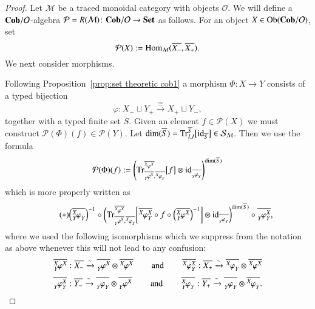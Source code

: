 \documentclass{amsart}
\def\tn{\textnormal}
\def\mc{\mathcal}
\def\Hom{\tn{Hom}}
\def\Ob{\tn{Ob}}
\def\dim{\tn{dim}}
\def\Trace{\tn{Tr}}
\def\hsp{\hspace{.3in}}
\def\to{\rightarrow}
\def\taking{\colon}
\def\too{\longrightarrow}
\def\iso{\cong}
\def\ol{\overline}
\newcommand{\To}[1]{\xrightarrow{#1}}
\def\id{\tn{id}}
\def\Cob{{\bf Cob}}
\def\Set{{\bf Set}}
\def\mcM{\mc{M}}
\def\mcO{\mc{O}}
\def\mcP{\mc{P}}
\def\mcS{\mc{S}}
\newcommand{\inp}[1]{{#1_-}}
\newcommand{\outp}[1]{{#1_+}}
\newcommand{\feeddd}[3]{{\tensor*[^{#2}_{\color{white}{!}}]{{#1}}{^{#3}}}}%
\newcommand{\feeddc}[3]{{\tensor*[^{#2}]{{#1}}{_{#3}}}}
\newcommand{\feedcd}[3]{{\tensor*[_{#2}]{{#1}}{^{#3}}}}
\newcommand{\feedcc}[3]{{\tensor*[^{\color{white}{!}}_{#2}]{{#1}}{_{#3}}}}
\newcommand{\feedda}[3]{{\tensor*[^{#2}_{\color{white}{!}}]{{#1}}{^{#2}_{#3}}}}
\newcommand{\feedca}[3]{{\tensor*[_{#2}]{{#1}}{_{#2}^{#3}}}}
\newcommand{\feedad}[3]{{\tensor*[^{#2}_{#3}]{{#1}}{^{#2}}}}
\newcommand{\feedac}[3]{{\tensor*[_{#2}^{#3}]{{#1}}{_{#2}}}}
\newcommand{\vLst}[1]{\ol{#1}}
\newcommand{\vinp}[1]{\vLst{\inp{#1}}}
\newcommand{\voutp}[1]{\vLst{\outp{#1}}}
\theoremstyle{remark}
\theoremstyle{definition}
\begin{document}
\begin{proof}

Let $\mcM$ be a traced monoidal category with objects $\mcO$. We will define a $\Cob/\mcO$-algebra $\mcP=R(\mcM)\taking\Cob/\mcO\to\Set$ as follows. For an object $X\in\Ob(\Cob/\mcO)$, set 
$$\mcP(X):=\Hom_{\mcM}(\vinp{X},\voutp{X}).$$
We next consider morphisms.


Following Proposition~\ref{prop:set theoretic cob1} a morphism $\Phi\taking X\too Y$ consists of a typed bijection 
$$\varphi\taking\inp{X}\sqcup \outp{Y}\To{\iso}\outp{X}\sqcup \inp{Y},$$ 
together with a typed finite set $S$. Given an element $f\in\mcP(X)$ we must construct $\mcP(\Phi)(f)\in\mcP(Y)$. Let $\dim(\ol{S})=\Trace^{\ol{S}}_{I,I}\big[\id_{\ol{S}}\big]\in\mcS_\mcM$. Then we use the formula
$$\mcP(\Phi)(f):=
\left(\Trace^{\ol{\feeddd{\varphi}{X}{X}}}_{\ol{\feedcd{\varphi}{Y}{X}},\ol{\feeddc{\varphi}{X}{Y}}}\big[f\big]
\otimes\id_{\ol{\feedcc{\varphi}{Y}{Y}}}\right)^{\dim(\ol{S})}
$$
which is more properly written as
\[\tag{$*$}\Big(\ol{\feedac{\varphi}{Y}{X}}\Big)^{-1}\circ\bigg(\Trace^{\ol{\feeddd{\varphi}{X}{X}}}_{\ol{\feedcd{\varphi}{Y}{X}},\ol{\feeddc{\varphi}{X}{Y}}}\bigg[\ol{\feedda{\varphi}{X}{Y}}\circ f\circ\Big(\ol{\feedad{\varphi}{X}{Y}}\Big)^{-1}\bigg]
\otimes\id_{\ol{\feedcc{\varphi}{Y}{Y}}}\bigg)^{\dim(\ol{S})}\circ\ol{\feedca{\varphi}{Y}{X}},\]
where we used the following isomorphisms which we suppress from the notation as above whenever this will not lead to any confusion:
$$
\ol{\feedad{\varphi}{X}{Y}}:\ol{\inp{X}}\To{\sim}\ol{\feedcd{\varphi}{Y}{X}}\otimes\ol{\feeddd{\varphi}{X}{X}}
\hsp\tn{and}\hsp
\ol{\feedda{\varphi}{X}{Y}}:\ol{\outp{X}}\To{\sim}\ol{\feeddc{\varphi}{X}{Y}}\otimes\ol{\feeddd{\varphi}{X}{X}}
$$
$$
\ol{\feedca{\varphi}{Y}{X}}:\ol{\inp{Y}}\To{\sim}\ol{\feedcc{\varphi}{Y}{Y}}\otimes\ol{\feedcd{\varphi}{Y}{X}}
\hsp\tn{and}\hsp
\ol{\feedac{\varphi}{Y}{X}}:\ol{\outp{Y}}\To{\sim}\ol{\feedcc{\varphi}{Y}{Y}}\otimes\ol{\feeddc{\varphi}{X}{Y}}.
$$


\end{proof}
\end{document}
